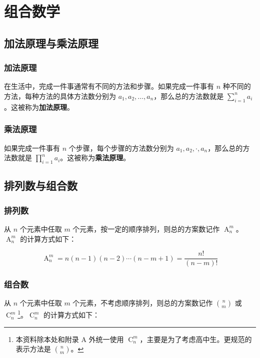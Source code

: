 \chapter{组合数学}

\section{加法原理与乘法原理}

\subsection{加法原理}

在生活中，完成一件事通常有不同的方法和步骤。如果完成一件事有 $n$ 种不同的方法，每种方法的具体方法数分别为 $a_1, a_2, \dots, a_n$，那么总的方法数就是 $\sum\limits_{i=1}^{n} a_i$。这被称为\textbf{加法原理}。

\subsection{乘法原理}

如果完成一件事有 $n$ 个步骤，每个步骤的方法数分别为 $a_1, a_2, \cdot, a_n$，那么总的方法数就是 $\prod\limits_{i=1}^{n} a_i$。这被称为\textbf{乘法原理}。

\section{排列数与组合数}

\subsection{排列数}

从 $n$ 个元素中任取 $m$ 个元素，按一定的顺序排列，则总的方案数记作 $\operatorname{A}_n^m$。$\operatorname{A}_n^m$ 的计算方式如下：

\[
\operatorname{A}_n^m = n(n-1)(n-2) \cdots (n-m+1) = \frac{n!}{(n-m)!}
\]

\subsection{组合数}

从 $n$ 个元素中任取 $m$ 个元素，不考虑顺序排列，则总的方案数记作 $\binom{n}{m}$ 或 $\operatorname{C}_n^m$\hspace{0.3em}\footnote{\quad 本资料除本处和附录 A 外统一使用 $\operatorname{C}_n^m$，主要是为了考虑高中生。更规范的表示方法是 $\binom{n}{m}$。}。$\operatorname{C}_n^m$ 的计算方式如下：

